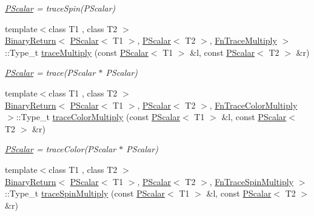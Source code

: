 \begin{DoxyCompactItemize}
\begin{DoxyCompactList}\small\item\em \mbox{\hyperlink{classENSEM_1_1PScalar}{P\+Scalar}} = trace\+Spin(\+P\+Scalar) \end{DoxyCompactList}\item 
{\footnotesize template$<$class T1 , class T2 $>$ }\\\mbox{\hyperlink{structENSEM_1_1BinaryReturn}{Binary\+Return}}$<$ \mbox{\hyperlink{classENSEM_1_1PScalar}{P\+Scalar}}$<$ T1 $>$, \mbox{\hyperlink{classENSEM_1_1PScalar}{P\+Scalar}}$<$ T2 $>$, \mbox{\hyperlink{structENSEM_1_1FnTraceMultiply}{Fn\+Trace\+Multiply}} $>$\+::Type\+\_\+t \mbox{\hyperlink{group__primscalar_gafbab702f52c534882636a524d002b106}{trace\+Multiply}} (const \mbox{\hyperlink{classENSEM_1_1PScalar}{P\+Scalar}}$<$ T1 $>$ \&l, const \mbox{\hyperlink{classENSEM_1_1PScalar}{P\+Scalar}}$<$ T2 $>$ \&r)
\begin{DoxyCompactList}\small\item\em \mbox{\hyperlink{classENSEM_1_1PScalar}{P\+Scalar}} = trace(\+P\+Scalar $\ast$ P\+Scalar) \end{DoxyCompactList}\item 
{\footnotesize template$<$class T1 , class T2 $>$ }\\\mbox{\hyperlink{structENSEM_1_1BinaryReturn}{Binary\+Return}}$<$ \mbox{\hyperlink{classENSEM_1_1PScalar}{P\+Scalar}}$<$ T1 $>$, \mbox{\hyperlink{classENSEM_1_1PScalar}{P\+Scalar}}$<$ T2 $>$, \mbox{\hyperlink{structENSEM_1_1FnTraceColorMultiply}{Fn\+Trace\+Color\+Multiply}} $>$\+::Type\+\_\+t \mbox{\hyperlink{group__primscalar_ga7d0ad8d52e28a6e277de161b427932eb}{trace\+Color\+Multiply}} (const \mbox{\hyperlink{classENSEM_1_1PScalar}{P\+Scalar}}$<$ T1 $>$ \&l, const \mbox{\hyperlink{classENSEM_1_1PScalar}{P\+Scalar}}$<$ T2 $>$ \&r)
\begin{DoxyCompactList}\small\item\em \mbox{\hyperlink{classENSEM_1_1PScalar}{P\+Scalar}} = trace\+Color(\+P\+Scalar $\ast$ P\+Scalar) \end{DoxyCompactList}\item 
{\footnotesize template$<$class T1 , class T2 $>$ }\\\mbox{\hyperlink{structENSEM_1_1BinaryReturn}{Binary\+Return}}$<$ \mbox{\hyperlink{classENSEM_1_1PScalar}{P\+Scalar}}$<$ T1 $>$, \mbox{\hyperlink{classENSEM_1_1PScalar}{P\+Scalar}}$<$ T2 $>$, \mbox{\hyperlink{structENSEM_1_1FnTraceSpinMultiply}{Fn\+Trace\+Spin\+Multiply}} $>$\+::Type\+\_\+t \mbox{\hyperlink{group__primscalar_gadf055daaaacb2711107a9c9dbba9a129}{trace\+Spin\+Multiply}} (const \mbox{\hyperlink{classENSEM_1_1PScalar}{P\+Scalar}}$<$ T1 $>$ \&l, const \mbox{\hyperlink{classENSEM_1_1PScalar}{P\+Scalar}}$<$ T2 $>$ \&r)

\end{DoxyCompactItemize}
